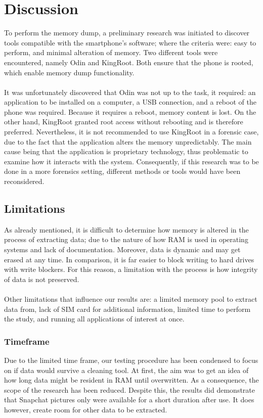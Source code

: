 \section{Discussion}
To perform the memory dump, a preliminary research was initiated to discover tools compatible with the smartphone's software; where the criteria were: easy to perform, and minimal alteration of memory. Two different tools were encountered, namely Odin and KingRoot. Both ensure that the phone is rooted, which enable memory dump functionality.\\\\
It was unfortunately discovered that Odin was not up to the task, it required: an application to be installed on a computer, a USB connection, and a reboot of the phone was required. Because it requires a reboot, memory content is lost. On the other hand, KingRoot granted root access without rebooting and is therefore preferred. Nevertheless, it is not recommended to use KingRoot in a forensic case, due to the fact that the application alters the memory unpredictably. The main cause being that the application is proprietary technology, thus problematic to examine how it interacts with the system. Consequently, if this research was to be done in a more forensics setting, different methods or tools would have been reconsidered.
\subsection{Limitations}
As already mentioned, it is difficult to determine how memory is altered in the process of extracting data; due to the nature of how RAM is used in operating systems and lack of documentation. Moreover, data is dynamic and may get erased at any time. In comparison, it is far easier to block writing to hard drives with write blockers. For this reason, a limitation with the process is how integrity of data is not preserved.\\\\
Other limitations that influence our results are: a limited memory pool to extract data from, lack of SIM card for additional information, limited time to perform the study, and running all applications of interest at once.

\subsubsection{Timeframe}
Due to the limited time frame, our testing procedure has been condensed to focus on if data would survive a cleaning tool. At first, the aim was to get an idea of how long data might be resident in RAM until overwritten. As a consequence, the scope of the research has been reduced. Despite this, the results did demonstrate that Snapchat pictures only were available for a short duration after use. It does however, create room for other data to be extracted.
